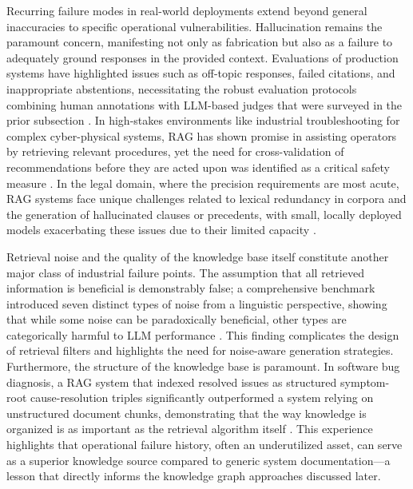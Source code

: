 \documentclass[11pt]{article}
\begin{document}
Recurring failure modes in real-world deployments extend beyond general inaccuracies to specific operational vulnerabilities. Hallucination remains the paramount concern, manifesting not only as fabrication but also as a failure to adequately ground responses in the provided context. Evaluations of production systems have highlighted issues such as off-topic responses, failed citations, and inappropriate abstentions, necessitating the robust evaluation protocols combining human annotations with LLM-based judges that were surveyed in the prior subsection \cite{ref591}. In high-stakes environments like industrial troubleshooting for complex cyber-physical systems, RAG has shown promise in assisting operators by retrieving relevant procedures, yet the need for cross-validation of recommendations before they are acted upon was identified as a critical safety measure \cite{ref592}. In the legal domain, where the precision requirements are most acute, RAG systems face unique challenges related to lexical redundancy in corpora and the generation of hallucinated clauses or precedents, with small, locally deployed models exacerbating these issues due to their limited capacity \cite{ref593}.

Retrieval noise and the quality of the knowledge base itself constitute another major class of industrial failure points. The assumption that all retrieved information is beneficial is demonstrably false; a comprehensive benchmark introduced seven distinct types of noise from a linguistic perspective, showing that while some noise can be paradoxically beneficial, other types are categorically harmful to LLM performance \cite{ref64}. This finding complicates the design of retrieval filters and highlights the need for noise-aware generation strategies. Furthermore, the structure of the knowledge base is paramount. In software bug diagnosis, a RAG system that indexed resolved issues as structured symptom-root cause-resolution triples significantly outperformed a system relying on unstructured document chunks, demonstrating that the way knowledge is organized is as important as the retrieval algorithm itself \cite{ref594}. This experience highlights that operational failure history, often an underutilized asset, can serve as a superior knowledge source compared to generic system documentation---a lesson that directly informs the knowledge graph approaches discussed later.
\end{document}
